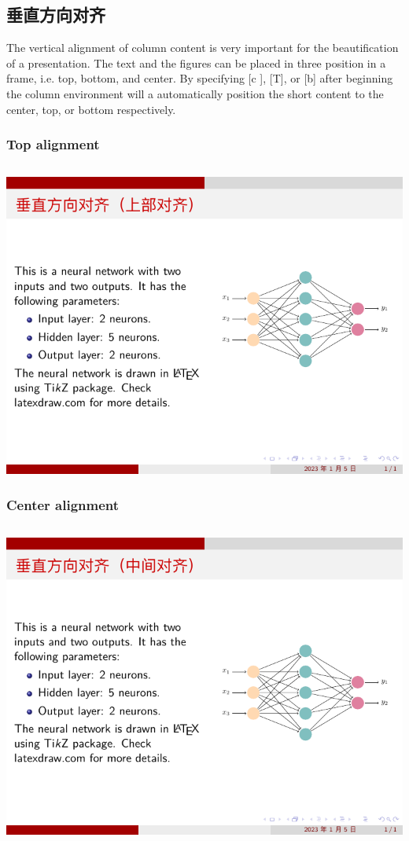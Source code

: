\subsection{垂直方向对齐}

The vertical alignment of column content is very important for the beautification of a presentation. The text and the figures can be placed in three position in a frame, i.e. top, bottom, and center. By specifying [c ], [T], or [b] after beginning the column environment will a automatically position the short content to the center, top, or bottom respectively.

\subsubsection{Top alignment}

\inputminted[linenos=true]{latex}{examples/beamer/beamercolumn04.tex}

\includegraphics{examples/beamer/beamercolumn04.pdf}

\subsubsection{Center alignment}

\inputminted[linenos=true]{latex}{examples/beamer/beamercolumn05.tex}

\includegraphics{examples/beamer/beamercolumn05.pdf}

